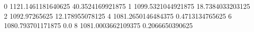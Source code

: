 0 1121.1461181640625 40.3524169921875
1 1099.5321044921875 18.7384033203125
2 1092.97265625 12.178955078125
4 1081.2650146484375 0.4713134765625
6 1080.793701171875 0.0
8 1081.0003662109375 0.2066650390625
